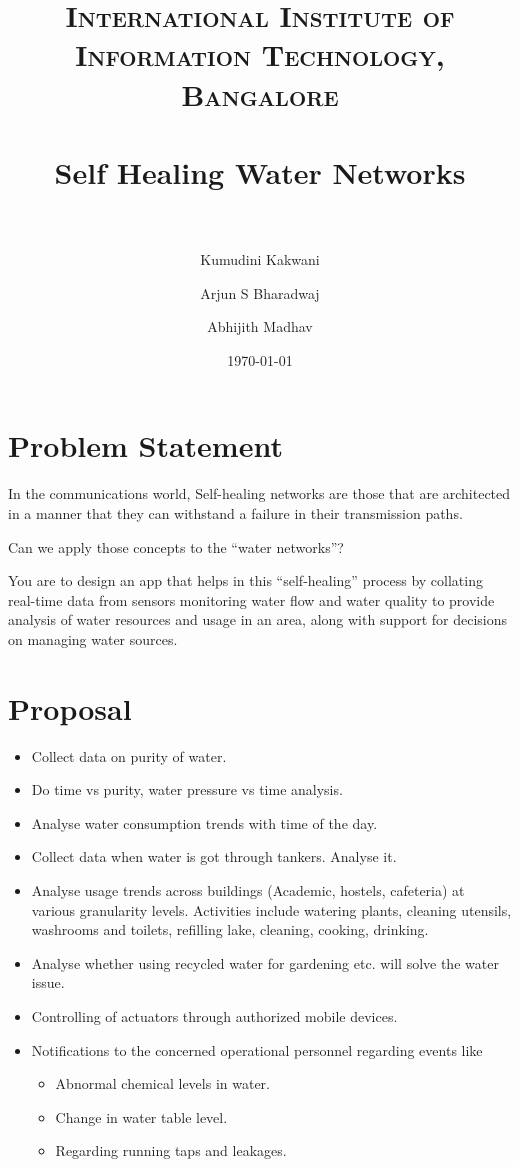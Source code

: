 \documentclass[paper=a4, fontsize=11pt]{scrartcl} %
\title{	
\normalfont \normalsize 
\textsc{International Institute of Information Technology, Bangalore} \\ [25pt] %
\horrule{0.5pt} \\[0.4cm] %
\huge Self Healing Water Networks \\ %
\horrule{2pt} \\[0.5cm] %
}
\author{Kumudini Kakwani 
\and Arjun S Bharadwaj
\and Abhijith Madhav}
\date{\normalsize\today} %
\numberwithin{equation}{section} %
\numberwithin{figure}{section} %
\numberwithin{table}{section} %
\begin{document}
\maketitle %


\section{Problem Statement}



In the communications world, Self-healing networks are those that are architected in a manner that they can withstand a failure in their transmission paths.
 
Can we apply those concepts to the ``water networks''?
 
You are to design an app that helps in this ``self-healing'' process by collating real-time data from sensors monitoring water flow and water quality to provide analysis of water resources and usage in an area, along with support for decisions on managing water sources.



\section{Proposal}
\begin{itemize}
\item Collect data on purity of water. 
\item Do time vs purity, water pressure vs time analysis.
\item Analyse water consumption trends with time of the day.
\item Collect data when water is got through tankers. Analyse it.
\item Analyse usage trends across buildings (Academic, hostels, cafeteria) at various granularity levels. Activities include watering plants, cleaning utensils, washrooms and toilets, refilling lake, cleaning, cooking, drinking.
\item Analyse whether using recycled water for gardening etc. will solve the water issue.
\item Controlling of actuators through authorized mobile devices.
\item Notifications to the concerned operational personnel regarding events like 
\begin{itemize}
\item Abnormal chemical levels in water.
\item Change in water table level.
\item Regarding running taps and leakages.
\end{itemize}
\end{itemize}
\end{document}
